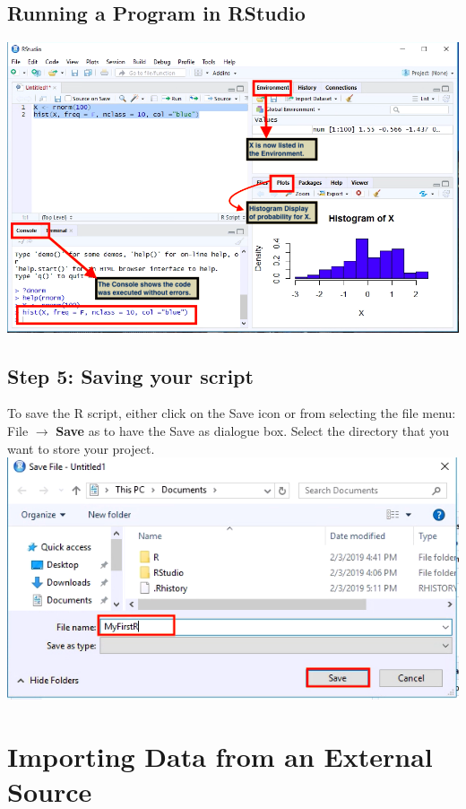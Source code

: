 \documentclass[a4paper]{report}
\begin{document}
\begin{flushleft}
        \subsection*{Running a Program in RStudio}
        \includegraphics[width=\textwidth]{images/SP5.png}
        
        \subsection*{Step 5: Saving your script}
        To save the R script, either click on the Save icon  or from selecting the file menu: File $\longrightarrow$ \textbf{Save} as to have the Save as dialogue box. Select the directory that you want to store your project.
        \includegraphics[width=\textwidth]{images/SP6.png}
        \end{flushleft}
    
    \section{Importing Data from an External Source}
    
\end{document}
